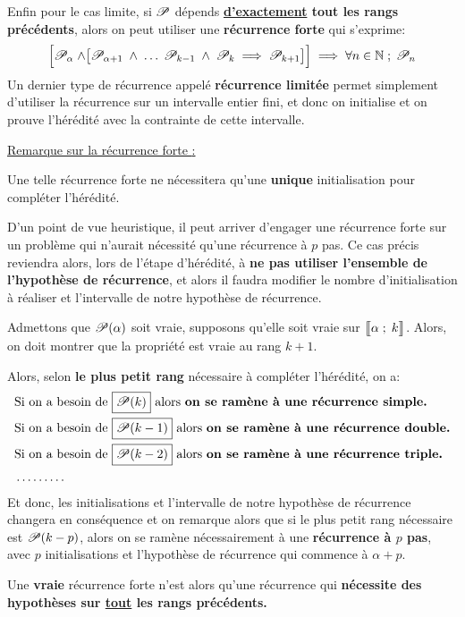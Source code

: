 Enfin pour le cas limite, si \(\P\) dépends \textbf{\underline{d'exactement} tout les rangs précédents}, alors on peut utiliser une \textbf{récurrence forte} qui s'exprime:
\[
   \Bigr[ \P_{\alpha} \; \land \bigr[ \P_{\alpha + 1} \; \land \; \ldots \; \P_{k-1} \; \land \; \P_{k} \implies \P_{k+1}  \bigr] \Bigr] \implies \forall n \in \N \; ; \; \P_n   
\]
Un dernier type de récurrence appelé \textbf{récurrence limitée} permet simplement d'utiliser la récurrence sur un intervalle entier fini, et donc on initialise et on prouve l'hérédité avec la contrainte de cette intervalle.\<


\underline{Remarque sur la récurrence forte {:}}\<

Une telle récurrence forte ne nécessitera qu'une \textbf{unique} initialisation pour compléter l'hérédité.\<

D'un point de vue heuristique, il peut arriver d'engager une récurrence forte sur un problème qui n'aurait nécessité qu'une récurrence à \(p\) pas.\+
Ce cas précis reviendra alors, lors de l'étape d'hérédité, à \textbf{ne pas utiliser l'ensemble de l'hypothèse de récurrence}, et alors il faudra modifier le nombre d'initialisation à réaliser et l'intervalle de notre hypothèse de récurrence.\<

Admettons que \(\P(\alpha)\) soit vraie, supposons qu'elle soit vraie sur \(\inticc{\alpha}{k}\). Alors, on doit montrer que la propriété est vraie au rang \(k + 1\).\<

Alors, selon \textbf{le plus petit rang} nécessaire à compléter l'hérédité, on a:
\begin{align*}
    & \text{Si on a besoin de }\boxed{\P(k)} \text{ alors \textbf{on se ramène à une récurrence simple.}}\\
    & \text{Si on a besoin de }\boxed{\P(k-1)} \text{ alors \textbf{on se ramène à une récurrence double.}}\\
    & \text{Si on a besoin de }\boxed{\P(k-2)} \text{ alors \textbf{on se ramène à une récurrence triple.}}\\
    & \ldots\ldots\ldots
\end{align*}
Et donc, les initialisations et l'intervalle de notre hypothèse de récurrence changera en conséquence et on remarque alors que si le plus petit rang nécessaire est \(\P(k-p)\), alors on se ramène nécessairement à une \textbf{récurrence à \(p\) pas}, avec \(p\) initialisations et l'hypothèse de récurrence qui commence à \(\alpha + p\).\<

Une \textbf{vraie} récurrence forte n'est alors qu'une récurrence qui \textbf{nécessite des hypothèses sur \underline{tout} les rangs précédents.}
   

